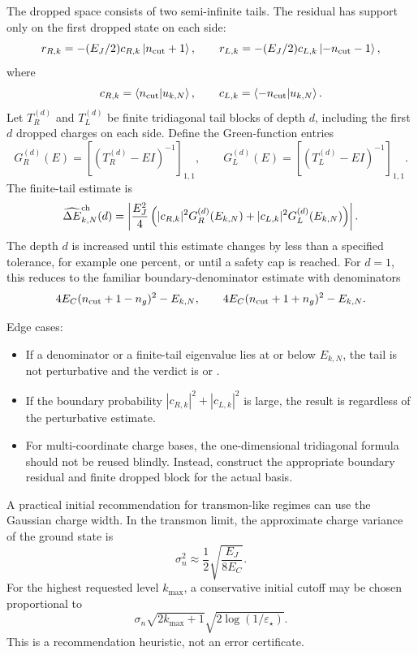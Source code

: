\documentclass[11pt,a4paper]{article}
\newcommand{\ket}[1]{\left|#1\right\rangle}
\newcommand{\braket}[2]{\left\langle#1\middle|#2\right\rangle}
\newcommand{\ncut}{n_{\rm cut}}
\newcommand{\eps}{\varepsilon}
\newcommand{\EJ}{E_J}
\newcommand{\EC}{E_C}
\newcommand{\errhat}{\widehat{\Delta E}}
\newcommand{\code}[1]{\texttt{\detokenize{#1}}}
\begin{document}
The dropped space consists of two semi-infinite tails.  The residual has support only on the first dropped state on each side:
\begin{equation}
  r_{R,k}=-(\EJ/2)c_{R,k}\ket{\ncut+1},\qquad
  r_{L,k}=-(\EJ/2)c_{L,k}\ket{-\ncut-1},
\end{equation}
where
\begin{equation}
  c_{R,k}=\braket{\ncut}{u_{k,N}},\qquad c_{L,k}=\braket{-\ncut}{u_{k,N}}.
\end{equation}
Let $T_R^{(d)}$ and $T_L^{(d)}$ be finite tridiagonal tail blocks of depth $d$, including the first $d$ dropped charges on each side.  Define the Green-function entries
\begin{equation}
  G_R^{(d)}(E)=\left[(T_R^{(d)}-EI)^{-1}\right]_{1,1},\qquad
  G_L^{(d)}(E)=\left[(T_L^{(d)}-EI)^{-1}\right]_{1,1}.
\end{equation}
The finite-tail estimate is
\begin{equation}
  \errhat_{k,N}^{\rm ch}(d)=
  \left|\frac{\EJ^2}{4}\left(|c_{R,k}|^2G_R^{(d)}(E_{k,N})+|c_{L,k}|^2G_L^{(d)}(E_{k,N})\right)\right|.
\end{equation}
The depth $d$ is increased until this estimate changes by less than a specified tolerance, for example one percent, or until a safety cap is reached.  For $d=1$, this reduces to the familiar boundary-denominator estimate with denominators
\begin{equation}
  4\EC(\ncut+1-n_g)^2-E_{k,N},\qquad
  4\EC(\ncut+1+n_g)^2-E_{k,N}.
\end{equation}

Edge cases:
\begin{itemize}
\item If a denominator or a finite-tail eigenvalue lies at or below $E_{k,N}$, the tail is not perturbative and the verdict is \code{unverified} or \code{distrust}.
\item If the boundary probability $|c_{R,k}|^2+|c_{L,k}|^2$ is large, the result is \code{distrust} regardless of the perturbative estimate.
\item For multi-coordinate charge bases, the one-dimensional tridiagonal formula should not be reused blindly.  Instead, construct the appropriate boundary residual and finite dropped block for the actual basis.
\end{itemize}

A practical initial recommendation for transmon-like regimes can use the Gaussian charge width.  In the transmon limit, the approximate charge variance of the ground state is
\begin{equation}
  \sigma_n^2\approx \frac12\sqrt{\frac{\EJ}{8\EC}}.
\end{equation}
For the highest requested level $k_{\max}$, a conservative initial cutoff may be chosen proportional to
\begin{equation}
  \sigma_n\sqrt{2k_{\max}+1}\sqrt{2\log(1/\eps_\star)}.
\end{equation}
This is a recommendation heuristic, not an error certificate.
\end{document}
